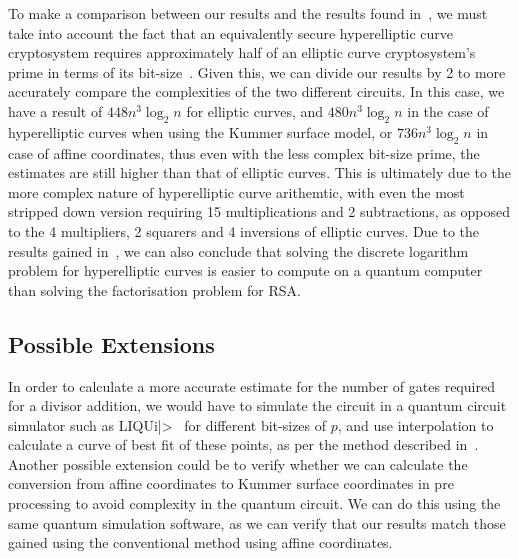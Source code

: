 To make a comparison between our results and the results found in~\cite{roetteler2017quantum}, we must take into account the fact that an equivalently secure hyperelliptic curve cryptosystem requires approximately half of an elliptic curve cryptosystem's prime in terms of its bit-size~\cite{cryptoeprint:2012:670}. Given this, we can divide our results by 2 to more accurately compare the complexities of the two different circuits. In this case, we have a result of  $448n^3\log_2n$ for elliptic curves, and $480n^3\log_2n$ in the case of hyperelliptic curves when using the Kummer surface model, or $736n^3\log_2n$ in case of affine coordinates, thus even with the less complex bit-size prime, the estimates are still higher than that of elliptic curves. This is ultimately due to the more complex nature of hyperelliptic curve arithemtic, with even the most stripped down version requiring 15 multiplications and 2 subtractions, as opposed to the 4 multipliers, 2 squarers and 4 inversions of elliptic curves. Due to the results gained in~\cite{roetteler2017quantum}, we can also conclude that solving the discrete logarithm problem for hyperelliptic curves is easier to compute on a quantum computer than solving the factorisation problem for RSA.
\subsection{Possible Extensions}
In order to calculate a more accurate estimate for the number of gates required for a divisor addition, we would have to simulate the circuit in a quantum circuit simulator such as {LIQU}i|>~\cite{1402.4467} for different bit-sizes of $p$, and use interpolation to calculate a curve of best fit of these points, as per the method described in~\cite{roetteler2017quantum}.
Another possible extension could be to verify whether we can calculate the conversion from affine coordinates to Kummer surface coordinates in pre processing to avoid complexity in the quantum circuit. We can do this using the same quantum simulation software, as we can verify that our results match those gained using the conventional method using affine coordinates.